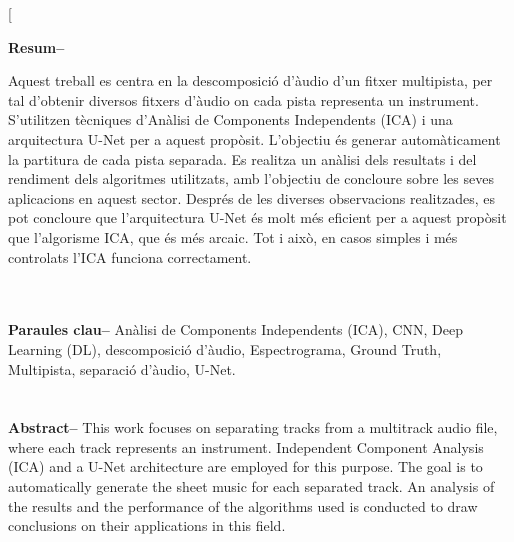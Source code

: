 \documentclass[10pt,a4paper,twocolumn,twoside]{article}
\begin{document}
\twocolumn[\begin{@twocolumnfalse}


\maketitle

\thispagestyle{primerapagina}
\begin{center}
\parbox{0.915\textwidth}
{\sffamily
\textbf{Resum--}

Aquest treball es centra en la descomposició d'àudio d'un fitxer multipista, per tal d'obtenir diversos fitxers d'àudio on cada pista representa un instrument. S'utilitzen tècniques d'Anàlisi de Components Independents (ICA) i una arquitectura U-Net per a aquest propòsit. L'objectiu és generar automàticament la partitura de cada pista separada. Es realitza un anàlisi dels resultats i del rendiment dels algoritmes utilitzats, amb l'objectiu de concloure sobre les seves aplicacions en aquest sector.
Després de les diverses observacions realitzades, es pot concloure que l'arquitectura U-Net és molt més eficient per a aquest propòsit que l'algorisme ICA, que és més arcaic. Tot i això, en casos simples i més controlats l'ICA funciona correctament.

\\
\\
\textbf{Paraules clau-- } Anàlisi de Components Independents (ICA), CNN, Deep Learning (DL), descomposició d'àudio, Espectrograma, Ground Truth,  Multipista, separació d'àudio, U-Net.\\
\\
\bigskip
\\
\textbf{Abstract--} 
This work focuses on separating tracks from a multitrack audio file, where each track represents an instrument. Independent Component Analysis (ICA) and a U-Net architecture are employed for this purpose. The goal is to automatically generate the sheet music for each separated track. An analysis of the results and the performance of the algorithms used is conducted to draw conclusions on their applications in this field.

}
\end{center}
\end{@twocolumnfalse}
\end{document}
